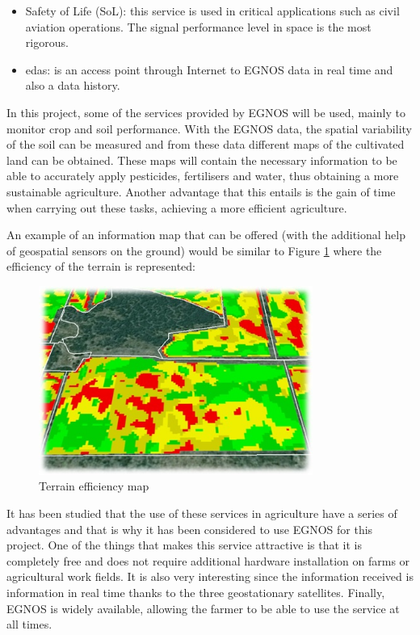 \begin{itemize}
\begin{itemize}
        \item Safety of Life (SoL): this service is used in critical applications such as civil aviation operations. The signal performance level in space is the most rigorous.
        
        \item \gls{edas}: is an access point through Internet to EGNOS data in real time and also a data history.
        
    \end{itemize}

    In this project, some of the services provided by EGNOS will be used, mainly to monitor crop and soil performance. With the EGNOS data, the spatial variability of the soil can be measured and from these data different maps of the cultivated land can be obtained. These maps will contain the necessary information to be able to accurately apply pesticides, fertilisers and water, thus obtaining a more sustainable agriculture. Another advantage that this entails is the gain of time when carrying out these tasks, achieving a more efficient agriculture.

    An example of an information map that can be offered (with the additional help of geospatial sensors on the ground) would be similar to Figure \ref{fig:egnos} where the efficiency of the terrain is represented:
    
    \begin{figure}
        \centering
        \includegraphics[width=0.8\textwidth]{images/egnos.jpg}
        \caption{Terrain efficiency map}
        \label{fig:egnos}
    \end{figure} 
    
    It has been studied that the use of these services in agriculture have a series of advantages and that is why it has been considered to use EGNOS for this project. One of the things that makes this service attractive is that it is completely free and does not require additional hardware installation on farms or agricultural work fields. It is also very interesting since the information received is information in real time thanks to the three geostationary satellites. Finally, EGNOS is widely available, allowing the farmer to be able to use the service at all times.
    

\end{itemize}
